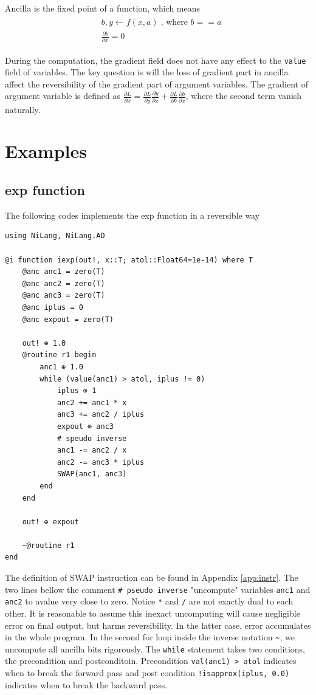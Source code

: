 \documentclass{article}
\newcommand{\<}{\langle}
\renewcommand{\>}{\rangle}
\newcommand{\App}[1]{Appendix \ref{#1}}
\begin{document}
Ancilla is the fixed point of a function, which means 
\begin{align}
    \begin{split}
    &b, y \leftarrow f(x, a)\; \text{, where } b==a\\
    &\frac{\partial b}{\partial x} = 0
    \end{split}
\end{align}

During the computation, the gradient field does not have any effect to the \texttt{value} field of variables. The key question is will the loss of gradient part in ancilla affect the reversibility of the gradient part of argument variables.
The gradient of argument variable is defined as $\frac{\partial L}{\partial x} = \frac{\partial L}{\partial y}\frac{\partial y}{\partial x} + \frac{\partial L}{\partial b}\frac{\partial b}{\partial x}$, where the second term vanish naturally.

\section{Examples}
\subsection{exp function}
The following codes implements the exp function in a reversible way

\begin{minipage}{.44\textwidth}
\begin{lstlisting}
using NiLang, NiLang.AD

@i function iexp(out!, x::T; atol::Float64=1e-14) where T
    @anc anc1 = zero(T)
    @anc anc2 = zero(T)
    @anc anc3 = zero(T)
    @anc iplus = 0
    @anc expout = zero(T)

    out! ⊕ 1.0
    @routine r1 begin
        anc1 ⊕ 1.0
        while (value(anc1) > atol, iplus != 0)
            iplus ⊕ 1
            anc2 += anc1 * x
            anc3 += anc2 / iplus
            expout ⊕ anc3
            # speudo inverse
            anc1 -= anc2 / x
            anc2 -= anc3 * iplus
            SWAP(anc1, anc3)
        end
    end

    out! ⊕ expout

    ~@routine r1
end
\end{lstlisting}
\end{minipage}

The definition of SWAP instruction can be found in \App{app:instr}.
The two lines bellow the comment \texttt{\# pseudo inverse} "uncompute" variables \texttt{anc1} and \texttt{anc2} to avalue very close to zero. Notice \texttt{*} and \texttt{/} are not exactly dual to each other.
It is reasonable to assume this inexact uncomputing will cause negligible error on final output, but harms reversibility. In the latter case, error accumulates in the whole program.
In the second for loop inside the inverse notation \texttt{\~}, we uncompute all ancilla bits rigorously.
The \texttt{while} statement takes two conditions, the precondition and postconditoin. Precondition \texttt{val(anc1) > atol} indicates when to break the forward pass and post condition \texttt{!isapprox(iplus, 0.0)} indicates when to break the backward pass.
\end{document}
